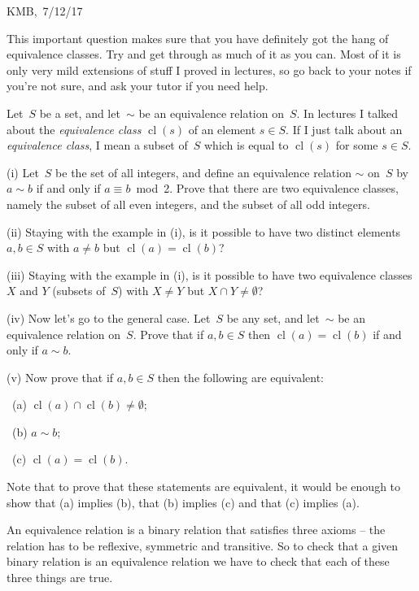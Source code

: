 \documentclass[10pt]{article}
\DeclareMathOperator{\cl}{cl}
\begin{document}
\begin{flushright} KMB,\ 7/12/17\end{flushright}


\medskip{} This important question makes sure that you have definitely got the hang of equivalence classes. Try and get through as much of it as you can. Most of it is only very mild extensions of stuff I proved in lectures, so go back to your notes if you're not sure, and ask your tutor if you need help.

Let~$S$ be a set, and let~$\sim$ be an equivalence relation on~$S$. In lectures I talked about the \emph{equivalence class} $\cl(s)$ of an element $s\in S$. If I just talk about an \emph{equivalence class}, I mean a subset of~$S$ which is equal to $\cl(s)$ for some $s\in S$.

(i) Let~$S$ be the set of all integers, and define an equivalence relation $\sim$ on~$S$ by $a\sim b$ if and only if $a\equiv b$~mod~2. Prove that there are two equivalence classes, namely the subset of all even integers, and the subset of all odd integers.

(ii) Staying with the example in (i), is it possible to have two distinct elements $a,b\in S$ with $a\not=b$ but $\cl(a)=\cl(b)$?

(iii) Staying with the example in (i), is it possible to have two equivalence classes $X$ and $Y$ (subsets of~$S$) with $X\not=Y$ but $X\cap Y\not=\emptyset$?

(iv) Now let's go to the general case. Let~$S$ be any set, and let~$\sim$ be an equivalence relation on~$S$. Prove that if $a,b\in S$ then $\cl(a)=\cl(b)$ if and only if $a\sim b$.

(v) Now prove that if $a,b\in S$ then the following are equivalent:

\ (a) $\cl(a)\cap\cl(b)\not=\emptyset$;

\ (b) $a\sim b$;

\ (c) $\cl(a)=\cl(b)$.

Note that to prove that these statements are equivalent, it would be enough to show that (a) implies (b), that (b) implies (c) and that (c) implies (a).

\medskip{} An equivalence relation is a binary relation that satisfies three axioms -- the relation has to be reflexive, symmetric and transitive. So to check that a given binary relation is an equivalence relation we have to check that each of these three things are true. 
\end{document}
